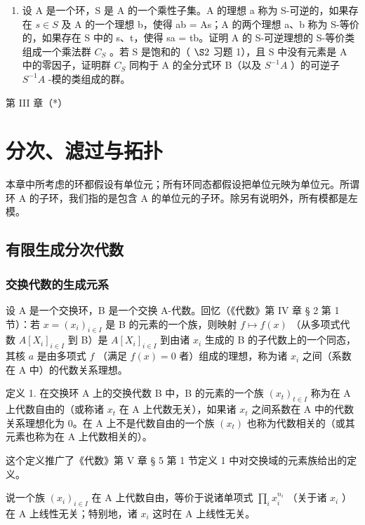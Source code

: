 \begin{enumerate}
\def\labelenumi{\arabic{enumi}.}
\setcounter{enumi}{24}
\tightlist
\item
  设 A 是一个环，S 是 A 的一个乘性子集。A 的理想 a 称为 S-可逆的，如果存在 \(s \in S\) 及 A 的一个理想 b，使得 ab = As；A 的两个理想 a、b 称为 S-等价的，如果存在 S 中的 s、t，使得 sa = tb。证明 A 的 S-可逆理想的 S-等价类组成一个乘法群 \(C_{S}\) 。若 S 是饱和的（ \(\S 2\) 习题 1），且 S 中没有元素是 A 中的零因子，证明群 \(C_{S}\) 同构于 A 的全分式环 B（以及 \(S^{-1}A\) ）的可逆子 \(S^{-1}A\) -模的类组成的群。
\end{enumerate}

第 III 章（*）

\chapter{分次、滤过与拓扑}

本章中所考虑的环都假设有单位元；所有环同态都假设把单位元映为单位元。所谓环 A 的子环，我们指的是包含 A 的单位元的子环。除另有说明外，所有模都是左模。

\section{有限生成分次代数}

\subsection{交换代数的生成元系}

设 A 是一个交换环，B 是一个交换 A-代数。回忆（《代数》第 IV 章 § 2 第 1 节）：若 \(x = (x_{i})_{i \in I}\) 是 B 的元素的一个族，则映射 \(f \mapsto f(x)\) （从多项式代数 \(A[X_{i}]_{i \in I}\) 到 B）是 \(A[X_{i}]_{i \in I}\) 到由诸 \(x_{i}\) 生成的 B 的子代数上的一个同态，其核 \(a\) 是由多项式 \(f\) （满足 \(f(x) = 0\) 者）组成的理想，称为诸 \(x_{i}\) 之间（系数在 A 中）的代数关系理想。

定义 1. 在交换环 A 上的交换代数 B 中，B 的元素的一个族 \((x_{t})_{t\in I}\) 称为在 A 上代数自由的（或称诸 \(x_{t}\) 在 A 上代数无关），如果诸 \(x_{t}\) 之间系数在 A 中的代数关系理想化为 0。在 A 上不是代数自由的一个族 \((x_{t})\) 也称为代数相关的（或其元素也称为在 A 上代数相关的）。

这个定义推广了《代数》第 V 章 § 5 第 1 节定义 1 中对交换域的元素族给出的定义。

说一个族 \((x_{i})_{i\in I}\) 在 A 上代数自由，等价于说诸单项式 \(\prod_{i}x_{i}^{n_{i}}\) （关于诸 \(x_{i}\) ）在 A 上线性无关；特别地，诸 \(x_{i}\) 这时在 A 上线性无关。

